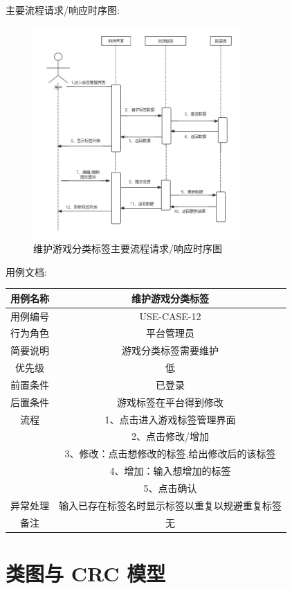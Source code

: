 \documentclass[12pt]{ctexart} %
\begin{document}
主要流程请求/响应时序图:
\begin{figure}[ht]
  \centering
  \includegraphics[width=0.7\textwidth]{yongli12.jpg}
  \caption{维护游戏分类标签主要流程请求/响应时序图}
\end{figure}
用例文档:

\begin{tabular}{|c|c|}
  \hline
  用例名称& 维护游戏分类标签\\
  \hline
  用例编号 & USE-CASE-12\\
  \hline
  行为角色 & 平台管理员\\
  \hline
  简要说明 & 游戏分类标签需要维护\\
  \hline
  优先级 & 低\\
  \hline
  前置条件 & 已登录\\
  \hline
  后置条件 & 游戏标签在平台得到修改\\
  \hline
  流程 & 1、点击进入游戏标签管理界面\\
      &  2、点击修改/增加\\
      &  3、修改：点击想修改的标签,给出修改后的该标签\\
      &  4、增加：输入想增加的标签\\
      &  5、点击确认\\
  \hline
  异常处理 &  输入已存在标签名时显示标签以重复以规避重复标签\\
  \hline
  备注 & 无\\
  \hline
\end{tabular}

\section{类图与 CRC 模型}
\end{document}
